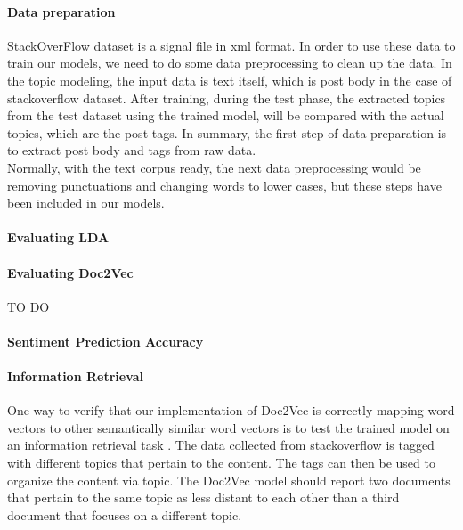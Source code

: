 \paragraph{Data preparation} 
StackOverFlow dataset is a signal file in xml format. In order to use these data to train our models, we need to do some data preprocessing to clean up the data. In the topic modeling, the input data is text itself, which is post body in the case of stackoverflow dataset. After training, during the test phase, the extracted topics from the test dataset using the trained model, will be compared with the actual topics, which are the post tags. In summary, the first step of data preparation is to extract post body and tags from raw data.\\
Normally, with the text corpus ready, the next data preprocessing would be removing punctuations and changing words to lower cases, but these steps have been included in our models.
\paragraph{Evaluating LDA}


\paragraph{Evaluating Doc2Vec}
TO DO

\paragraph{Sentiment Prediction Accuracy}
%
%
%
%

\paragraph{Information Retrieval}

One way to verify that our implementation of Doc2Vec is correctly mapping word vectors to other semantically similar word vectors is to test the trained model on an information retrieval task . \cite{RefWorks:doc:5a6e5746e4b0d609eec798d7} The data collected from stackoverflow is tagged with different topics that pertain to the content. The tags can then be used to organize the content via topic. The Doc2Vec model should report two documents that pertain to the same topic as less distant to each other than a third document that focuses on a different topic.

